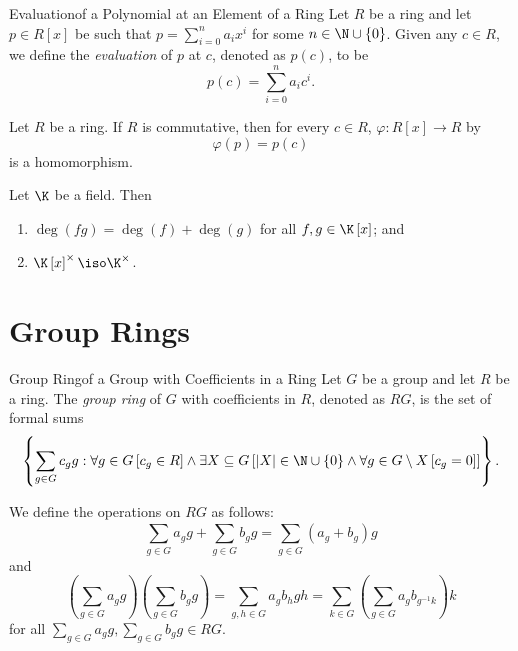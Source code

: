 \documentclass[pmath347]{subfiles}
\begin{document}
    \begin{definition}{Evaluation}{of a Polynomial at an Element of a Ring}
        Let $R$ be a ring and let $p\in R\left[ x \right]$ be such that $p = \sum^{n}_{i=0} a_ix^i$ for some $n\in\N\cup\left\lbrace 0 \right\rbrace$. Given any $c\in R$, we define the \emph{evaluation} of $p$ at $c$, denoted as $p\left( c \right)$, to be
        \begin{equation*}
            p\left( c \right) = \sum^{n}_{i=0} a_ic^i.
        \end{equation*}
    \end{definition}

    \begin{prop}{}
        Let $R$ be a ring. If $R$ is commutative, then for every $c\in R$, $\varphi:R\left[ x \right] \to R$ by
        \begin{equation*}
            \varphi\left( p \right) = p\left( c \right) 
        \end{equation*}
        is a homomorphism.
    \end{prop}

    \begin{prop}{}
        Let $\K$ be a field. Then
        \begin{enumerate}
            \item $\deg\left( fg \right) = \deg\left( f \right) + \deg\left( g \right)$ for all $f,g\in\K\left[ x \right]$; and
            \item $\K\left[ x \right] ^{\times}\iso\K^{\times}$.
        \end{enumerate}
    \end{prop}

    \section{Group Rings}
    
    \begin{definition}{Group Ring}{of a Group with Coefficients in a Ring}
        Let $G$ be a group and let $R$ be a ring. The \emph{group ring} of $G$ with coefficients in $R$, denoted as $RG$, is the set of formal sums
        \begin{equation*}
            \left\lbrace \sum^{}_{g\in G} c_gg: \forall g\in G\left[ c_g\in R \right] \land \exists X\subseteq G\left[ \left| X \right| \in\N\cup\left\lbrace 0 \right\rbrace \land \forall g\in G\setminus X \left[ c_g = 0 \right]  \right]  \right\rbrace .
        \end{equation*}
    \end{definition}

    \np We define the operations on $RG$ as follows:
    \begin{equation*}
        \sum^{}_{g\in G} a_gg + \sum^{}_{g\in G}b_gg = \sum^{}_{g\in G} \left( a_g+b_g \right) g 
    \end{equation*}     
    and
    \begin{equation*}
        \left( \sum^{}_{g\in G} a_gg \right) \left( \sum^{}_{g\in G} b_gg \right) = \sum^{}_{g,h\in G} a_gb_hgh = \sum^{}_{k\in G} \left( \sum^{}_{g\in G} a_gb_{g^{-1} k} \right)  k
    \end{equation*}
    for all $\sum^{}_{g\in G} a_gg, \sum^{}_{g\in G} b_gg\in RG$.
\end{document}
